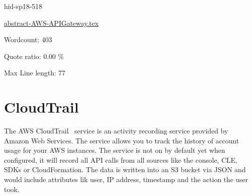 





\begin{IU}

hid-sp18-518

\href{https://github.com/cloudmesh-community/hid-sp18-518/blob/master//technology/abstract-AWS-APIGateway.tex}{abstract-AWS-APIGateway.tex}

 

Wordcount: 403


Quote ratio: 0.00 \%
 
Max Line length: 77
\end{IU}

\section{CloudTrail}

The AWS CloudTrail~\cite{hid-sp18-518-CloudTrail} service is an activity 
recording service provided by Amazon Web Services. The service allows you 
to track the history of account usage for your AWS instances. The service 
is not on by default yet when configured, it will record all API calls from
all sources like the console, CLE, SDKs or CloudFormation. The data is 
written into an S3 bucket via JSON and would include attributes lik user,
IP address, timestamp and the action the user took.


